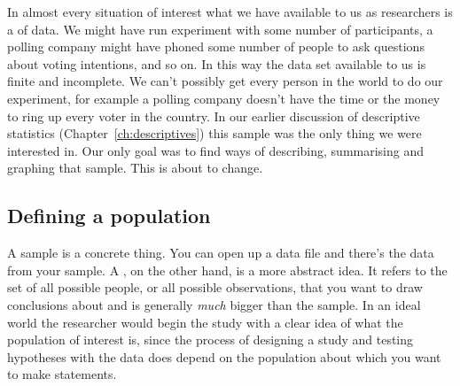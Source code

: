 In almost every situation of interest what we have available to us as researchers is a  of data. We might have run experiment with some number of participants, a polling company might have phoned some number of people to ask questions about voting intentions, and so on. In this way the data set available to us is finite and incomplete. We can't possibly get every person in the  world to do our experiment, for example a polling company doesn't have the time or the money to ring up every voter in the country. In our earlier discussion of descriptive statistics (Chapter~\ref{ch:descriptives}) this sample was the only thing we were interested in. Our only goal was to find ways of describing, summarising and graphing that sample. This is about to change.

\subsection{Defining a population~\label{sec:pop}}

A sample is a concrete thing. You can open up a data file and there's the data from your sample. A , on the other hand, is a more abstract idea. It refers to the set of all possible people, or all possible observations, that you want to draw conclusions about and is generally {\it much} bigger than the sample. In an ideal world the researcher would begin the study with a clear idea of what the population of interest is, since the process of designing a study and testing hypotheses with the data does depend on the population about which you want to make statements. 

